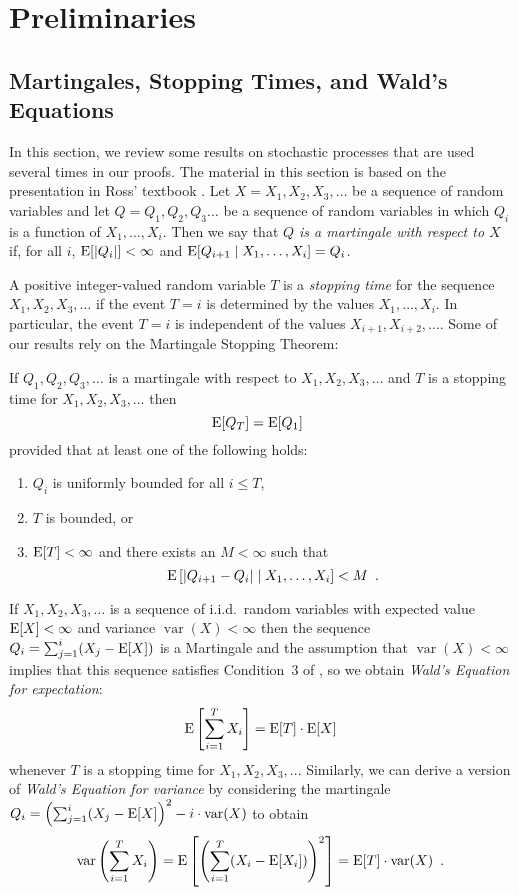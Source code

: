 \documentclass[acmtoalg]{acmtrans2m}
\DeclareMathOperator{\var}{var}
\begin{document}
\section{Preliminaries}

\subsection{Martingales, Stopping Times, and Wald's Equations}

In this section, we review some results on stochastic processes that
are used several times in our proofs.  The material in this section is
based on the presentation in Ross' textbook \cite[Chapter 6]{ross}.
Let $X=X_1,X_2,X_3,\ldots$ be a sequence of random variables and let
$Q=Q_1,Q_2,Q_3\ldots$ be a sequence of random variables in which $Q_i$
is a function of $X_1,\ldots,X_i$.  Then we say that \emph{$Q$ is a
martingale with respect to $X$} if, for all $i$, $\mathrm{E}[|Q_i|] < \infty$
and $\mathrm{E}[Q_{i+1}\mid X_1,\ldots,X_i] = Q_i$.

A positive integer-valued random variable $T$ is a \emph{stopping
time} for the sequence $X_1,X_2,X_3,\ldots$ if the event $T=i$ is
determined by the values $X_1,\ldots,X_i$.  In particular, the event
$T=i$ is independent of the values $X_{i+1},X_{i+2},\ldots$.  Some of
our results rely on the Martingale Stopping Theorem:

\begin{thm}
If $Q_1,Q_2,Q_3,\ldots$ is a martingale with respect to
$X_1,X_2,X_3,\ldots$ and $T$ is a stopping time for
$X_1,X_2,X_3,\ldots$ then
\[
   \mathrm{E}[Q_T] = \mathrm{E}[Q_1] \enspace 
\]
provided that at least one of the following holds:
\begin{enumerate}
\item $Q_i$ is uniformly bounded for all $i\le T$,
\item $T$ is bounded, or
\item $\mathrm{E}[T] < \infty$ and there exists an $M<\infty$ such that
\[ \mathrm{E}\left[|Q_{i+1}-Q_i| \mid X_1,\ldots,X_i \right] < M  \enspace . \]
\end{enumerate}
\end{thm}

If $X_1,X_2,X_3,\ldots$ is a sequence of i.i.d.\ random variables with
expected value $\mathrm{E}[X]<\infty$ and variance $\var(X)<\infty$ then 
the sequence $Q_i=\sum_{j=1}^i(X_j-\mathrm{E}[X])$ is a Martingale and the
assumption that $\var(X)<\infty$ implies that this sequence satisfies
Condition~3 of , so we obtain \emph{Wald's Equation
for expectation}:
\begin{equation}
    \E\left[\sum_{i=1}^T X_i \right] = \E[T]\cdot\E[X] \eqlabel{wald-1}
\end{equation}
whenever $T$ is a stopping time for $X_1,X_2,X_3,\ldots$  Similarly,
we can derive a version of \emph{Wald's Equation for variance} by considering 
the martingale 
$Q_i=\left(\sum_{j=1}^i (X_j-\E[X]\right)^2 - i\cdot\var(X)$ 
to obtain
\begin{equation}
    \var\left(\sum_{i=1}^T X_i\right) = \E\left[\left(\sum_{i=1}^T (X_i-\E[X_i])\right)^2 \right] =
\E[T]\cdot\var(X) \enspace . \eqlabel{wald-2}
\end{equation}
\end{document}
